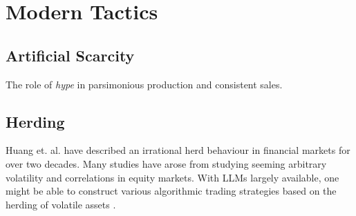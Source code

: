 \documentclass[11pt]{article}
\begin{document}
\section{Modern Tactics}
\subsection{Artificial Scarcity}
The role of \textit{hype} in parsimonious production and consistent sales.
\subsection{Herding}
Huang et. al. \cite{huang_2015_herd} have described an irrational herd behaviour in financial markets for over two decades. Many studies have arose from studying seeming arbitrary volatility and correlations in equity markets. With LLMs largely available, one might be able to construct various algorithmic trading strategies based on the herding of volatile assets \cite{vorobets_2024_portfolio}.
\newpage
\printbibliography
{}
\end{document}
